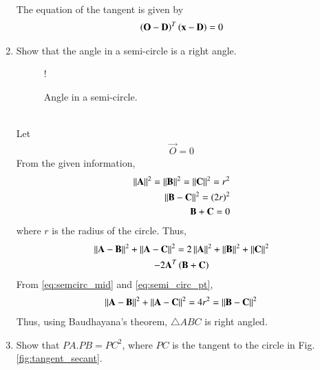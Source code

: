 \begin{enumerate}[label=\arabic*.,ref=\thesubsection.\theenumi]
\\
\solution The equation of the tangent is given by 
\begin{align}
\left(\mathbf{O}-\mathbf{D}\right)^T\left(\mathbf{x}-\mathbf{D}\right)=0
\end{align}
%
\item Show that the angle in a semi-circle is a right angle.
\begin{figure}[!h]
\centering
\resizebox {\columnwidth} {!} {

}
\caption{Angle in a semi-circle.}
\label{fig:ch2_line}
\end{figure}
\\
\solution Let 
\begin{align}
\vec{O} = 0
\end{align}
From the given information,
\begin{align}
\label{eq:semi_circ_pt}
\left\lVert\mathbf{A}\right\rVert^2 = \left\lVert\mathbf{B}\right\rVert^2 = \left\lVert\mathbf{C}\right\rVert^2 = r^2
\\
\left\lVert\mathbf{B}-\mathbf{C}\right\rVert^2 =  \left(2r\right)^2
\\
\mathbf{B} + \mathbf{C} = 0
\label{eq:semcirc_mid}
\end{align}
%
where $r$ is the radius of the circle. Thus,
\begin{multline}
\left\lVert\mathbf{A}-\mathbf{B}\right\rVert^2 + \left\lVert\mathbf{A}-\mathbf{C}\right\rVert^2 = 
2\left\lVert\mathbf{A}\right\rVert^2 + \left\lVert\mathbf{B}\right\rVert^2 + \left\lVert\mathbf{C}\right\rVert^2
\\
-2\mathbf{A}^T\left(\mathbf{B}+\mathbf{C}\right)
\end{multline}
From \eqref{eq:semcirc_mid} and \eqref{eq:semi_circ_pt},
\begin{multline}
\left\lVert\mathbf{A}-\mathbf{B}\right\rVert^2 + \left\lVert\mathbf{A}-\mathbf{C}\right\rVert^2 = 4r^2 = \left\lVert\mathbf{B}-\mathbf{C}\right\rVert^2 
\end{multline}
Thus, using Baudhayana's theorem, $\triangle ABC$ is right angled.
\item 	Show that $PA.PB = PC^2$, where $PC$ is the tangent to the circle in Fig. \ref{fig:tangent_secant}.

	\begin{figure}[!hb]
		\begin{center}
			

\end{center}
\end{figure}
\end{enumerate}
